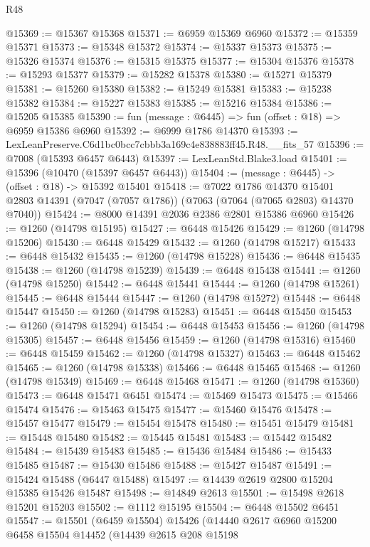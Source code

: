 \begin{lexlean}{R48}
\begin{coremodule}
@15369 := @15367 @15368
@15371 := @6959 @15369 @6960
@15372 := @15359 @15371
@15373 := @15348 @15372
@15374 := @15337 @15373
@15375 := @15326 @15374
@15376 := @15315 @15375
@15377 := @15304 @15376
@15378 := @15293 @15377
@15379 := @15282 @15378
@15380 := @15271 @15379
@15381 := @15260 @15380
@15382 := @15249 @15381
@15383 := @15238 @15382
@15384 := @15227 @15383
@15385 := @15216 @15384
@15386 := @15205 @15385
@15390 := fun (message : @6445) => fun (offset : @18) => @6959 @15386 @6960
@15392 := @6999 @1786 @14370
@15393 := LexLeanPreserve.C6d1bc0bcc7cbbb3a169c4e838883ff45.R48.__fits_57
@15396 := @7008 (@15393 @6457 @6443)
@15397 := LexLeanStd.Blake3.load
@15401 := @15396 (@10470 (@15397 @6457 @6443))
@15404 := (message : @6445) -> (offset : @18) -> @15392 @15401
@15418 := @7022
    @1786
    @14370
    @15401
    @2803
    @14391
    (@7047 (@7057 @1786))
    (@7063 (@7064 (@7065 @2803) @14370 @7040))
@15424 := @8000 @14391 @2036 @2386 @2801 @15386 @6960
@15426 := @1260 (@14798 @15195)
@15427 := @6448 @15426
@15429 := @1260 (@14798 @15206)
@15430 := @6448 @15429
@15432 := @1260 (@14798 @15217)
@15433 := @6448 @15432
@15435 := @1260 (@14798 @15228)
@15436 := @6448 @15435
@15438 := @1260 (@14798 @15239)
@15439 := @6448 @15438
@15441 := @1260 (@14798 @15250)
@15442 := @6448 @15441
@15444 := @1260 (@14798 @15261)
@15445 := @6448 @15444
@15447 := @1260 (@14798 @15272)
@15448 := @6448 @15447
@15450 := @1260 (@14798 @15283)
@15451 := @6448 @15450
@15453 := @1260 (@14798 @15294)
@15454 := @6448 @15453
@15456 := @1260 (@14798 @15305)
@15457 := @6448 @15456
@15459 := @1260 (@14798 @15316)
@15460 := @6448 @15459
@15462 := @1260 (@14798 @15327)
@15463 := @6448 @15462
@15465 := @1260 (@14798 @15338)
@15466 := @6448 @15465
@15468 := @1260 (@14798 @15349)
@15469 := @6448 @15468
@15471 := @1260 (@14798 @15360)
@15473 := @6448 @15471 @6451
@15474 := @15469 @15473
@15475 := @15466 @15474
@15476 := @15463 @15475
@15477 := @15460 @15476
@15478 := @15457 @15477
@15479 := @15454 @15478
@15480 := @15451 @15479
@15481 := @15448 @15480
@15482 := @15445 @15481
@15483 := @15442 @15482
@15484 := @15439 @15483
@15485 := @15436 @15484
@15486 := @15433 @15485
@15487 := @15430 @15486
@15488 := @15427 @15487
@15491 := @15424 @15488 (@6447 @15488)
@15497 := @14439 @2619 @2800 @15204 @15385 @15426 @15487
@15498 := @14849 @2613
@15501 := @15498 @2618 @15201 @15203
@15502 := @1112 @15195
@15504 := @6448 @15502 @6451
@15547 := @15501
    (@6459 @15504)
    @15426
    (@14440
      @2617
      @6960
      @15200
      @6458
      @15504
      @14452
      (@14439
        @2615
        @208
        @15198

\end{coremodule}
\end{lexlean}
